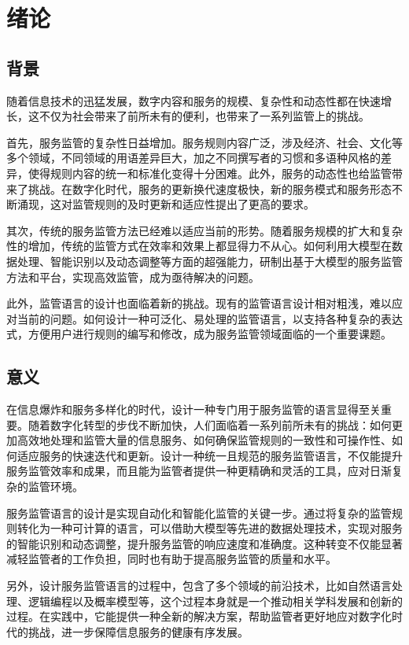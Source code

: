 \cleardoublepage

\section{绪论}

\subsection{背景}

随着信息技术的迅猛发展，数字内容和服务的规模、复杂性和动态性都在快速增长，这不仅为社会带来了前所未有的便利，也带来了一系列监管上的挑战。

首先，服务监管\cite{服务监管}的复杂性日益增加。服务规则内容广泛，涉及经济、社会、文化等多个领域，不同领域的用语差异巨大，加之不同撰写者的习惯和多语种风格的差异，使得规则内容的统一和标准化变得十分困难。此外，服务的动态性也给监管带来了挑战。在数字化时代，服务的更新换代速度极快，新的服务模式和服务形态不断涌现，这对监管规则的及时更新和适应性提出了更高的要求。

其次，传统的服务监管方法已经难以适应当前的形势。随着服务规模的扩大和复杂性的增加，传统的监管方式在效率和效果上都显得力不从心。如何利用大模型在数据处理、智能识别以及动态调整等方面的超强能力，研制出基于大模型的服务监管方法和平台，实现高效监管，成为亟待解决的问题。

此外，监管语言的设计也面临着新的挑战。现有的监管语言设计相对粗浅，难以应对当前的问题。如何设计一种可泛化、易处理的监管语言，以支持各种复杂的表达式，方便用户进行规则的编写和修改，成为服务监管领域面临的一个重要课题。


\subsection{意义}

在信息爆炸和服务多样化的时代，设计一种专门用于服务监管的语言显得至关重要。随着数字化转型的步伐不断加快，人们面临着一系列前所未有的挑战：如何更加高效地处理和监管大量的信息服务、如何确保监管规则的一致性和可操作性、如何适应服务的快速迭代和更新。设计一种统一且规范的服务监管语言，不仅能提升服务监管效率和成果，而且能为监管者提供一种更精确和灵活的工具，应对日渐复杂的监管环境。

服务监管语言的设计是实现自动化和智能化监管的关键一步。通过将复杂的监管规则转化为一种可计算的语言，可以借助大模型等先进的数据处理技术，实现对服务的智能识别和动态调整，提升服务监管的响应速度和准确度。这种转变不仅能显著减轻监管者的工作负担，同时也有助于提高服务监管的质量和水平。

另外，设计服务监管语言的过程中，包含了多个领域的前沿技术，比如自然语言处理、逻辑编程以及概率模型等，这个过程本身就是一个推动相关学科发展和创新的过程。在实践中，它能提供一种全新的解决方案，帮助监管者更好地应对数字化时代的挑战，进一步保障信息服务的健康有序发展。

